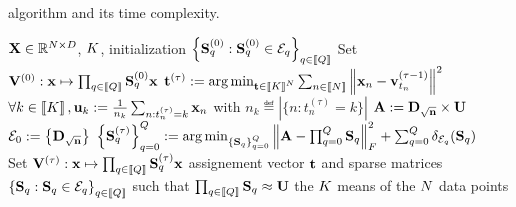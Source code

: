 \begin{algorithm}[t]
	\caption{\qkmeans algorithm and its time complexity.}
	\label{algo:qmeans}
	\begin{algorithmic}[1]
\REQUIRE ${\mathbf{X}} \in \mathbb{R}^{N \times D}$, $K$, initialization $\left \lbrace {\mathbf{S}}_q^{(0)} : {\mathbf{S}}_q^{(0)} \in \mathcal{E}_q\right \rbrace_{q\in\left \llbracket Q\right \rrbracket}$
\STATE Set ${\mathbf{V}}^{(0)} : {\mathbf{x}} \mapsto \prod_{q\in\left \llbracket Q\right \rrbracket}{{\mathbf{S}}_q^{(0)}} {\mathbf{x}}$
	\STATE ${\mathbf{t}}^{(\tau)} := \operatorname*{arg\,min}_{{\mathbf{t}} \in \left \llbracket K\right \rrbracket^N} \sum_{n\in\left \llbracket N\right \rrbracket} {\left \|{\mathbf{x}}_n - {\mathbf{v}}^{(\tau -1)}_{t_n}\right \|^2}$
	\label{line:qmeans:assignment}
	\STATE $\forall k\in\left \llbracket K\right \rrbracket, {\mathbf{u}}_k := \frac{1}{n_k} \sum_{n: t_n^{(\tau)}= k} {{\mathbf{x}}_n}$
with $n_k \eqdef |\{n: t_n^{(\tau)}=k\}|$
	\COMMENT{$\bigO{\nexamples\datadim}$}
	\label{line:qmeans:compute_means}
	\STATE ${\mathbf{A}} := {\mathbf{D}}_{\sqrt{{\mathbf{n}}}} \times {\mathbf{U}} $
	\COMMENT{$\bigO{\nclusters\datadim}$}
	\label{line:qmeans:A}
	\STATE $\mathcal{E}_0 := \left \lbrace {\mathbf{D}}_{\sqrt{{\mathbf{n}}}} \right \rbrace$
	\label{line:qmeans:E0}
	\STATE $\left \lbrace {\mathbf{S}}_q^{(\tau)}\right \rbrace_{q=0}^Q := \operatorname*{arg\,min}_{\left \lbrace {\mathbf{S}}_q\right \rbrace_{q=0}^Q} \left \|{\mathbf{A}} - \prod_{q=0}^Q{\mathbf{S}}_q\right \|_F^2 + \sum_{q=0}^Q \delta_{\mathcal{E}_q}({\mathbf{S}}_q)$\\
	\label{line:qmeans:S}
	\STATE Set ${\mathbf{V}}^{(\tau)} : {\mathbf{x}} \mapsto \prod_{q\in\left \llbracket Q\right \rrbracket}{{\mathbf{S}}_q^{(\tau)}} {\mathbf{x}}$
	\label{line:qmeans:U}
	\ENDFOR
	\ENSURE assignement vector ${\mathbf{t}}$ and sparse matrices $\left \lbrace {\mathbf{S}}_q : {\mathbf{S}}_q \in \mathcal{E}_q\right \rbrace_{q\in\left \llbracket Q\right \rrbracket}$ such that $\prod_{q\in\left \llbracket Q\right \rrbracket}{\mathbf{S}}_q \approx {\mathbf{U}}$ the $K$ means of the $N$ data points
\end{algorithmic}
\end{algorithm}

